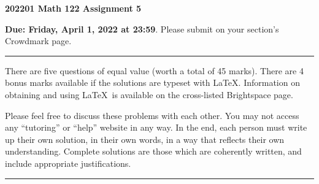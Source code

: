\documentclass[11 pt]{article}%
\begin{document}
\begin{center}
\textbf{{\Large 202201 Math 122 Assignment 5}}
\end{center}

\medskip\noindent\textbf{Due:  Friday, April 1, 2022 at 23:59}.  Please submit on your section's Crowdmark page.

\bigskip\hrule\medskip\noindent There are five questions of equal value (worth a total of 45 marks).   There are 4 bonus marks available if the solutions are typeset with \LaTeX.  Information on obtaining and using \LaTeX\ is available on the cross-listed Brightspace page.

\medskip\noindent
Please feel free to discuss these problems with each other.  
You may not  access  any ``tutoring'' or ``help'' website in any way. 
In the end, each person must write up their own solution, in their own words, in a way that reflects their own understanding.   Complete solutions are those which are coherently written, and include appropriate justifications.


\medskip\hrule
\end{document}
